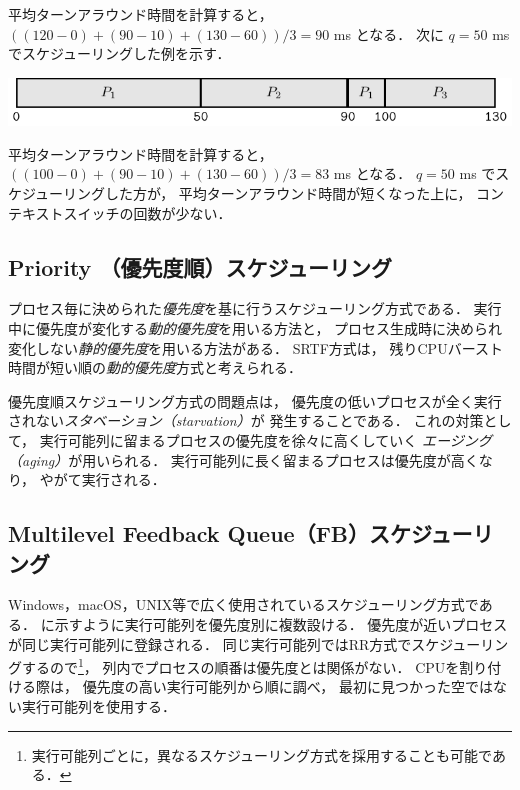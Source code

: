 平均ターンアラウンド時間を計算すると，
$((120-0)+(90-10)+(130-60))/3=90$ ms となる．
次に $q = 50$ ms でスケジューリングした例を示す．

\begin{center}
  \includegraphics[scale=1.0]{GanntChart/rr2.pdf}
\end{center}

平均ターンアラウンド時間を計算すると，
$((100-0)+(90-10)+(130-60))/3=83$ ms となる．
$q = 50$ ms でスケジューリングした方が，
平均ターンアラウンド時間が短くなった上に，
コンテキストスイッチの回数が少ない．

\subsection{Priority （優先度順）スケジューリング}
プロセス毎に決められた\emph{優先度}を基に行うスケジューリング方式である．
実行中に優先度が変化する\emph{動的優先度}を用いる方法と，
プロセス生成時に決められ変化しない\emph{静的優先度}を用いる方法がある．
SRTF方式は，
残りCPUバースト時間が短い順の\emph{動的優先度}方式と考えられる．

優先度順スケジューリング方式の問題点は，
優先度の低いプロセスが全く実行されない\emph{スタベーション（starvation）}が
発生することである．
これの対策として，
実行可能列に留まるプロセスの優先度を徐々に高くしていく
\emph{エージング（aging）}が用いられる．
実行可能列に長く留まるプロセスは優先度が高くなり，
やがて実行される．

\subsection{Multilevel Feedback Queue（FB）スケジューリング}
Windows，macOS，UNIX等で広く使用されているスケジューリング方式である．
に示すように実行可能列を優先度別に複数設ける．
優先度が近いプロセスが同じ実行可能列に登録される．
同じ実行可能列ではRR方式でスケジューリングするので\footnote{
  実行可能列ごとに，異なるスケジューリング方式を採用することも可能である．
}，
列内でプロセスの順番は優先度とは関係がない．
CPUを割り付ける際は，
優先度の高い実行可能列から順に調べ，
最初に見つかった空ではない実行可能列を使用する．


